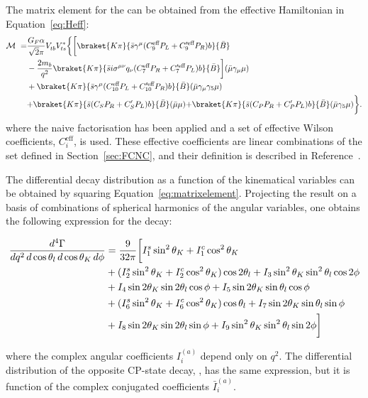 The matrix element for the \BtoKstmumudecay can be obtained from the effective Hamiltonian in Equation~\ref{eq:Heff}:
\begin{equation}\label{eq:matrixelement}
  \begin{split}
    {\mathcal M}\ =& \frac{G_F\alpha}{\sqrt{2}\pi}V_{tb}^{}V_{ts}^*\bigg\{\bigg[ \braket{K \pi}{\bar{s}\gamma^{\mu}({C_9^\text{eff}P_L+C_9^{\prime\text{eff}} P_R})b}{\bar B} \\
      &-\frac{2m_b}{q^2}\braket{K\pi}{\bar{s}i\sigma^{\mu\nu}q_{\nu}(C_7^\text{eff} P_R+C_7^{\prime\text{eff}}  P_L)b}{\bar B}\bigg](\bar{\mu}\gamma_{\mu}\mu)\\
    &+ \braket{K\pi}{\bar{s}\gamma^{\mu}({C_{10}^\text{eff} P_L+C_{10}^{\prime\text{eff}} P_R})b}{\bar B}(\bar{\mu}\gamma_{\mu}\gamma_5 \mu) \\
    & {+\braket{K \pi}{\bar{s} ({C_S P_R+C_S^\prime P_L}) b}{\bar B}(\bar{\mu}\mu)}{+\braket{K \pi}{\bar{s} ({C_P P_R+C_P^\prime P_L}) b}{\bar B}(\bar{\mu}\gamma_5\mu)} \bigg \}.
  \end{split}
\end{equation}
where the naive factorisation has been applied and a set of effective Wilson coefficients, $C_{i}^\text{eff}$, is used.
These effective coefficients are linear combinations of the set defined in Section~\ref{sec:FCNC}, and their definition is described in Reference~\cite{Altmannshofer:2008dz}.

The differential decay distribution as a function of the kinematical variables can be obtained by squaring Equation~\ref{eq:matrixelement}.
Projecting the result on a basis of combinations of spherical harmonics of the angular variables, one obtains the following expression for the \BtoKstmumuconjdecay decay:
\begin{small}
  \begin{align} \label{eq:angulardist}
    \frac{d^4\Gamma}{dq^2\, d\cos\theta_l\, d\cos\theta_K\, d\phi} &=\frac{9}{32\pi}\bigg[ I_1^s\sin^2\theta_K + I_1^c\cos^2\theta_K \nonumber\\
      & + (I_2^s\sin^2\theta_K + I_2^c\cos^2\theta_K)\cos2\theta_l + I_3 \sin^2\theta_K \sin^2\theta_l \cos 2\phi \nonumber \\
      & + I_4 \sin 2\theta_K \sin 2\theta_l \cos\phi + I_5 \sin 2\theta_K \sin\theta_l \cos\phi \nonumber \\
      & + (I_6^s \sin^2\theta_K + {I_6^c \cos^2\theta_K})  \cos\theta_l + I_7 \sin 2\theta_K \sin\theta_l \sin\phi \nonumber \\
    & + I_8 \sin 2\theta_K \sin 2\theta_l \sin\phi + I_9 \sin^2\theta_K \sin^2\theta_l \sin 2\phi \bigg]
  \end{align}
\end{small}
where the complex angular coefficients $I_i^{(a)}$ depend only on $q^2$.
The differential distribution of the opposite CP-state decay, \BtoKstmumudecay, has the same expression, but it is function of the complex conjugated coefficients $\bar{I}_i^{(a)}$.


